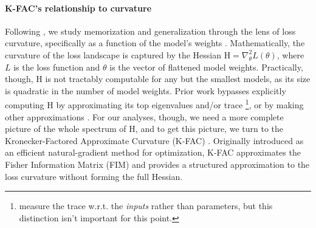 \documentclass{article} %
\newcommand{\matr}[1]{\ensuremath{\bm{\mathrm{#1}}}}
\begin{document}
\paragraph{K-FAC's relationship to curvature}
Following \citet{martens2015optimizing, foretsharpness}, we study memorization and generalization through the lens of loss curvature, specifically as a function of the model's weights \citep{keskar2017large}. 
Mathematically, the curvature of the loss landscape is captured by the Hessian $\matr{H} = \nabla^2_{\theta} L(\theta)$, where $L$ is the loss function and $\theta$ is the vector of flattened model weights. 
Practically, though, $\matr{H}$ is not tractably computable for any but the smallest models, as its size is quadratic in the number of model weights. Prior work bypasses explicitly computing $\matr{H}$ by approximating its top eigenvalues and/or trace \citet{ghorbani2019investigation, foretsharpness, ravikumar2024unveiling, garg2024memorization}\footnote{\citet{ravikumar2024unveiling, garg2024memorization} measure the trace w.r.t. the \textit{inputs} rather than parameters, but this distinction isn't important for this point.}, or by making other approximations \citet{hochreiter1997flat, keskar2017large}. For our analyses, though, we need a more complete picture of the whole spectrum of $\matr{H}$, and to get this picture,
we turn to the Kronecker-Factored Approximate Curvature (K-FAC) \citet{martens2015optimizing}. Originally introduced as an efficient natural-gradient method for optimization, K-FAC approximates the Fisher Information Matrix (FIM) and provides a structured approximation to the loss curvature without forming the full Hessian.
\end{document}
